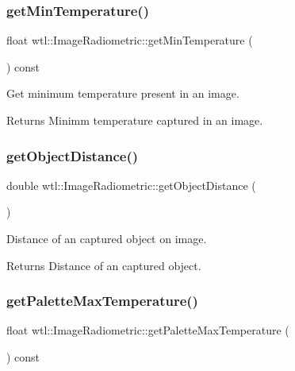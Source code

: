 \subsubsection{\texorpdfstring{get\+Min\+Temperature()}{getMinTemperature()}}
{\footnotesize\ttfamily float wtl\+::\+Image\+Radiometric\+::get\+Min\+Temperature (\begin{DoxyParamCaption}{ }\end{DoxyParamCaption}) const}



Get minimum temperature present in an image. 

\begin{DoxyReturn}{Returns}
Minimm temperature captured in an image. 
\end{DoxyReturn}
\mbox{\label{classwtl_1_1_image_radiometric_a6286201924bb258db0c1a2a4396f6f50}} 
\subsubsection{\texorpdfstring{get\+Object\+Distance()}{getObjectDistance()}}
{\footnotesize\ttfamily double wtl\+::\+Image\+Radiometric\+::get\+Object\+Distance (\begin{DoxyParamCaption}{ }\end{DoxyParamCaption})}



Distance of an captured object on image. 

\begin{DoxyReturn}{Returns}
Distance of an captured object. 
\end{DoxyReturn}
\mbox{\label{classwtl_1_1_image_radiometric_afaa9e2ee77818d64c856f941ac3c26a3}} 
\subsubsection{\texorpdfstring{get\+Palette\+Max\+Temperature()}{getPaletteMaxTemperature()}}
{\footnotesize\ttfamily float wtl\+::\+Image\+Radiometric\+::get\+Palette\+Max\+Temperature (\begin{DoxyParamCaption}{ }\end{DoxyParamCaption}) const}



